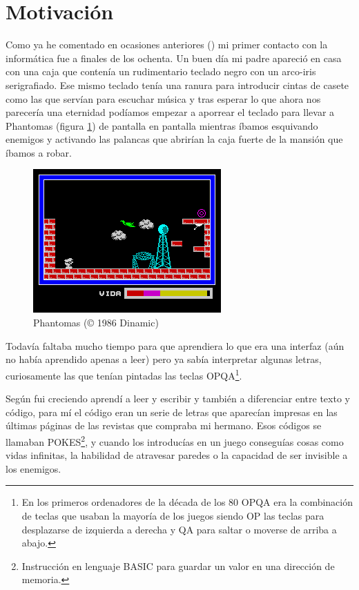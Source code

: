 \section{Motivación}

Como ya he comentado en ocasiones anteriores (\cite{ernesto_prado_2016}) mi primer contacto con la informática fue a finales de los ochenta. Un buen día mi padre apareció en casa con una caja que contenía un rudimentario teclado negro con un arco-iris serigrafiado. Ese mismo teclado tenía una ranura para introducir cintas de casete como las que servían para escuchar música y tras esperar lo que ahora nos parecería una eternidad podíamos empezar a aporrear el teclado para llevar a Phantomas (figura \ref{fig:phantomas}) de pantalla en pantalla mientras íbamos esquivando enemigos y activando las palancas que abrirían la caja fuerte de la mansión que íbamos a robar.


\begin{figure}[h!]
\centering
\includegraphics{../images/phantomas-sp1}
\caption{Phantomas (© 1986 Dinamic)}
\label{fig:phantomas}
\end{figure}

\bigskip
Todavía faltaba mucho tiempo para que aprendiera lo que era una interfaz (aún no había aprendido apenas a leer) pero ya sabía interpretar algunas letras, curiosamente las que tenían pintadas las teclas OPQA\footnote{En los primeros ordenadores de la década de los 80 OPQA era la combinación de teclas que usaban la mayoría de los juegos siendo OP las teclas para desplazarse de izquierda a derecha y QA para saltar o moverse de arriba a abajo.}.

\bigskip
Según fui creciendo aprendí a leer y escribir y también a diferenciar entre texto y código, para mí el código eran un serie de letras que aparecían impresas en las últimas páginas de las revistas que compraba mi hermano. Esos códigos se llamaban POKES\footnote{Instrucción en lenguaje BASIC para guardar un valor en una dirección de memoria.}, y cuando los introducías en un juego conseguías cosas como vidas infinitas, la habilidad de atravesar paredes o la capacidad de ser invisible a los enemigos.

